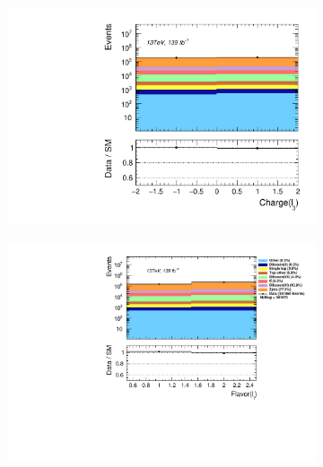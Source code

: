 \begin{figure}[H]
{\begin{subfigure}{.405\textwidth}
        \includegraphics[width=\textwidth]{Figures/FeaturesHistograms/lep3_Charge.pdf}
        \caption{}
        \label{fig:lep3_Charge}
    \end{subfigure}
    \hfill
    \begin{subfigure}{.525\textwidth}
        \includegraphics[width=\textwidth]{Figures/FeaturesHistograms/lep1_Flavor.pdf}
        \caption{}
        \label{fig:lep1_Flavor}
    \end{subfigure}
    }
\end{figure}

